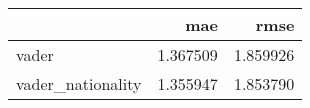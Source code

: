 \begin{tabular}{lrr}
\toprule
{} &       mae &      rmse \\
\midrule
vader             &  1.367509 &  1.859926 \\
vader\_nationality &  1.355947 &  1.853790 \\
\bottomrule
\end{tabular}
